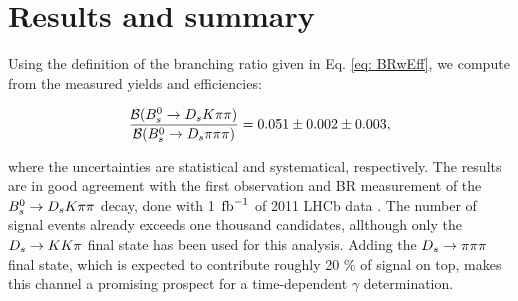 \section{Results and summary}
\label{sec: results}

Using the definition of the branching ratio given in Eq. \ref{eq: BRwEff}, we compute from the measured yields and efficiencies:

\begin{equation}
\frac{\mathcal{B}({{B}^0_{s}}\rightarrow{\ensuremath{{D}_{s}}}{\ensuremath{K}}{\ensuremath{\pi}}{\ensuremath{\pi}})}{\mathcal{B}({{B}^0_{s}}\rightarrow{\ensuremath{{D}_{s}}}{\ensuremath{\pi}}{\ensuremath{\pi}}{\ensuremath{\pi}})} = 0.051 \pm 0.002 \pm 0.003,
\label{eq: resultBR}
\end{equation}

where the uncertainties are statistical and systematical, respectively. \newline
The results are in good agreement with the first observation and BR measurement of the ${{B}^0_{s}}\rightarrow{\ensuremath{{D}_{s}}}{\ensuremath{K}}{\ensuremath{\pi}}{\ensuremath{\pi}}$ decay, done with 1 $\mbox{\,fb}^{-1}$ of 2011 LHCb data \cite{Blusk:2012it}.  
The number of signal events already exceeds one thousand candidates, allthough only the ${{D}_{s}}\rightarrow{\ensuremath{K}}{\ensuremath{K}}{\ensuremath{\pi}}$ final state has been used for this analysis. 
Adding the ${{D}_{s}}\rightarrow{\ensuremath{\pi}}{\ensuremath{\pi}}{\ensuremath{\pi}}$ final state, which is expected to contribute roughly 20 $\%$ of signal on top, makes this channel a promising prospect for a time-dependent $\gamma$ determination.

